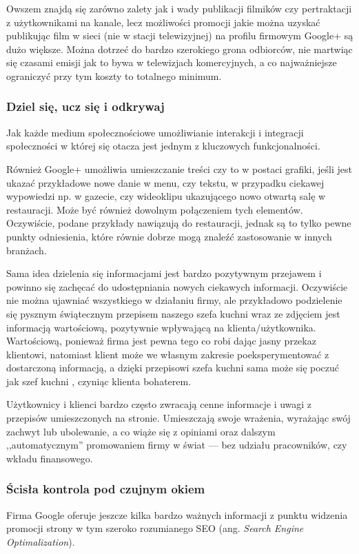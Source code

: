 Owszem znajdą się zarówno zalety jak i wady publikacji filmików czy pertraktacji z użytkownikami na kanale, lecz możliwości promocji jakie można uzyskać publikując film w sieci (nie w stacji telewizyjnej) na profilu firmowym Google+ są dużo większe. Można dotrzeć do bardzo szerokiego grona odbiorców, nie martwiąc się czasami emisji jak to bywa w telewizjach komercyjnych, a co najważniejsze ograniczyć przy tym koszty to totalnego minimum.


\subsubsection{Dziel się, ucz się i odkrywaj}
Jak każde medium społecznościowe umożliwianie interakcji i integracji społeczności w której się otacza jest jednym z kluczowych funkcjonalności. 

Również Google+ umożliwia umieszczanie treści czy to w postaci grafiki, jeśli jest ukazać przykładowe nowe danie w menu, czy tekstu, w przypadku ciekawej wypowiedzi np. w gazecie, czy wideoklipu ukazującego nowo otwartą salę w restauracji. Może być również dowolnym połączeniem tych elementów. Oczywiście, podane przykłady nawiązują do restauracji, jednak są to tylko pewne punkty odniesienia, które równie dobrze mogą znaleźć zastosowanie w innych branżach.

Sama idea dzielenia się informacjami jest bardzo pozytywnym przejawem i powinno się zachęcać do udostępniania nowych ciekawych informacji. Oczywiście nie można ujawniać wszystkiego w działaniu firmy, ale przykładowo podzielenie się pysznym świątecznym przepisem naszego szefa kuchni wraz ze zdjęciem jest informacją wartościową, pozytywnie wpływającą na klienta/użytkownika. Wartościową, ponieważ firma jest pewna tego co robi dając jasny przekaz klientowi, natomiast klient może we własnym zakresie poeksperymentować z dostarczoną informacją, a dzięki przepisowi szefa kuchni sama może się poczuć jak szef kuchni \cite[s.101]{Brogan12}, czyniąc klienta bohaterem.

Użytkownicy i klienci bardzo często zwracają cenne informacje i uwagi z przepisów umieszczonych na stronie. Umieszczają swoje wrażenia, wyrażając swój zachwyt lub ubolewanie, a co wiąże się z opiniami oraz dalszym ,,automatycznym'' promowaniem firmy w świat --- bez udziału pracowników, czy wkładu finansowego.


\subsubsection{Ścisła kontrola pod czujnym okiem}
Firma Google oferuje jeszcze kilka bardzo ważnych informacji z punktu widzenia promocji strony w tym szeroko rozumianego SEO (ang. \textit{Search Engine Optimalization}).